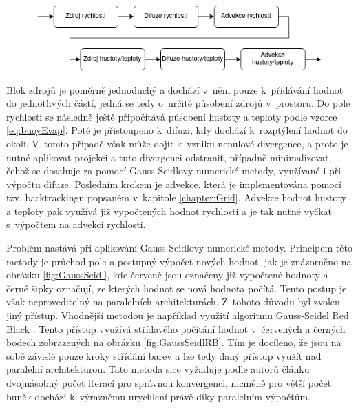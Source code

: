 \begin{figure}[hbt]
	\centering
	\captionsetup{justification=centering}
	\includegraphics[scale=0.6]{obrazky-figures/GridFluid.png}
	\label{fig:Gridflow}
\end{figure}

Blok zdrojů je poměrně jednoduchý a dochází v~něm pouze k~přidávání hodnot do jednotlivých částí, jedná se tedy o~určité působení zdrojů v~prostoru. Do pole rychlostí se následně ještě připočítává působení hustoty a teploty podle vzorce \ref{eq:buoyEvap}. Poté je přistoupeno k~difuzi, kdy dochází k~rozptýlení hodnot do okolí. V~tomto případě však může dojít k~vzniku nenulové divergence, a proto je nutné aplikovat projekci a tuto divergenci odstranit, případně minimalizovat, čehož se dosahuje za pomocí Gauss-Seidlovy numerické metody, využívané i při výpočtu difuze. Posledním krokem je advekce, která je implementována pomocí tzv. backtrackingu popsaném v~kapitole \ref{chapter:Grid}. Advekce hodnot hustoty a teploty pak využívá již vypočtených hodnot rychlosti a je tak nutné vyčkat s~výpočtem na advekci rychlosti.

Problém nastává při aplikování Gauss-Seidlovy numerické metody. Principem této metody je průchod pole a postupný výpočet nových hodnot, jak je znázorněno na obrázku \ref{fig:GaussSeidl}, kde červeně jsou označeny již vypočtené hodnoty a černé šipky označují, ze kterých hodnot se nová hodnota počítá. Tento postup je však neproveditelný na paralelních architekturách. Z~tohoto důvodu byl zvolen jiný přístup. Vhodnější metodou je například využití algoritmu Gauss-Seidel Red Black \cite{Amador2012LinearSF}. Tento přístup využívá střídavého počítání hodnot v~červených a černých bodech zobrazených na obrázku \ref{fig:GaussSeidlRB}. Tím je docíleno, že jsou na sobě závislé pouze kroky střídání barev a lze tedy daný přístup využít nad paralelní architekturou. Tato metoda sice vyžaduje podle autorů článku \cite{Amador2012LinearSF} dvojnásobný počet iterací pro správnou konvergenci, nicméně pro větší počet buněk dochází k~výraznému urychlení právě díky paralelním výpočtům.

